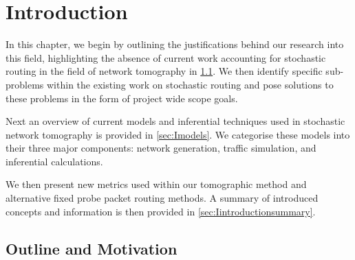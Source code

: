 \chapter{Introduction}
\label{cha:intro}
In this chapter, we begin by outlining the justifications behind our research into this field, highlighting the absence of current work accounting for stochastic routing in the field of network tomography in \cref{sec:Imotivationandoutline}. We then identify specific sub-problems within the existing work on stochastic routing and pose solutions to these problems
in the form of project wide scope goals.\par
Next an overview of current models and inferential techniques used in stochastic network tomography is provided in \cref{sec:Imodels}. We categorise these models into their three major components: network generation, traffic simulation, and inferential calculations.\par
We then present new metrics used within our tomographic method and alternative fixed probe packet routing methods. A summary of introduced concepts and information is then provided in \cref{sec:Iintroductionsummary}.\par

\section{Outline and Motivation}
\label{sec:Imotivationandoutline}


